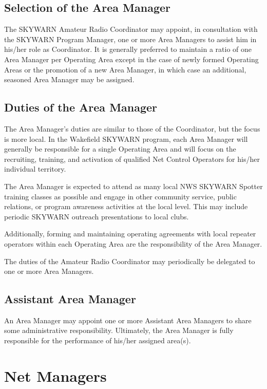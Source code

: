 \documentclass[pdflatex,letterpaper,twoside,12pt]{book}
\begin{document}
\subsection{Selection of the Area Manager}

The SKYWARN Amateur Radio Coordinator may appoint, in consultation with the SKYWARN Program Manager, one or more Area Managers to assist him in his/her role as Coordinator.  It is generally preferred to maintain a ratio of one Area Manager per Operating Area except in the case of newly formed Operating Areas or the promotion of a new Area Manager, in which case an additional, seasoned Area Manager may be assigned. 

\subsection{Duties of the Area Manager}

The Area Manager's duties are similar to those of the Coordinator, but the focus is more local.  In the Wakefield SKYWARN program, each Area Manager will generally be responsible for a single Operating Area and will focus on the recruiting, training, and activation of qualified Net Control Operators for his/her individual territory. 

The Area Manager is expected to attend as many local NWS SKYWARN Spotter training classes as possible and engage in other community service, public relations, or program awareness activities at the local level.  This may include periodic SKYWARN outreach presentations to local clubs.

Additionally, forming and maintaining operating agreements with local repeater operators within each Operating Area are the responsibility of the Area Manager.

The duties of the Amateur Radio Coordinator may periodically be delegated to one or more Area Managers.

\subsection{Assistant Area Manager}

An Area Manager may appoint one or more Assistant Area Managers to share some administrative responsibility.  Ultimately, the Area Manager is fully responsible for the performance of his/her assigned area(s).


\section{Net Managers}\label{net-manager}
\end{document}
